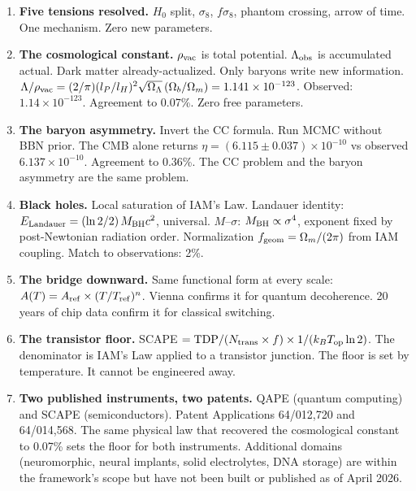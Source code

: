 \documentclass[12pt,a4paper]{article}
\begin{document}
\begin{enumerate}[leftmargin=1.5em,itemsep=0.3em]
\item \textbf{Five tensions resolved.} $H_0$ split, $\sigma_8$, $f\sigma_8$,
phantom crossing, arrow of time. One mechanism. Zero new parameters.

\item \textbf{The cosmological constant.} $\rho_{\rm vac}$ is total potential.
$\Lambda_{\rm obs}$ is accumulated actual. Dark matter already-actualized.
Only baryons write new information. $\Lambda/\rho_{\rm vac} = (2/\pi)(l_P/l_H)^2
\sqrt{\Omega_\Lambda}\,(\Omega_b/\Omega_m) = 1.141 \times 10^{-123}$.
Observed: $1.14 \times 10^{-123}$. Agreement to 0.07\%. Zero free parameters.

\item \textbf{The baryon asymmetry.} Invert the CC formula. Run MCMC without
BBN prior. The CMB alone returns $\eta = (6.115 \pm 0.037) \times 10^{-10}$
vs observed $6.137 \times 10^{-10}$. Agreement to 0.36\%. The CC problem and
the baryon asymmetry are the same problem.

\item \textbf{Black holes.} Local saturation of IAM's Law. Landauer identity:
$E_{\rm Landauer} = (\ln 2/2)\,M_{\rm BH}c^2$, universal. $M$--$\sigma$:
$M_{\rm BH} \propto \sigma^4$, exponent fixed by post-Newtonian radiation order.
Normalization $f_{\rm geom} = \Omega_m/(2\pi)$ from IAM coupling. Match to
observations: 2\%.

\item \textbf{The bridge downward.} Same functional form at every scale:
$A(T) = A_{\rm ref} \times (T/T_{\rm ref})^n$. Vienna confirms it for quantum
decoherence. 20 years of chip data confirm it for classical switching.

\item \textbf{The transistor floor.} SCAPE $= {\rm TDP}/(N_{\rm trans} \times f)
\times 1/(k_B T_{\rm op} \ln 2)$. The denominator is IAM's Law applied to a
transistor junction. The floor is set by temperature. It cannot be engineered away.

\item \textbf{Two published instruments, two patents.} QAPE (quantum computing)
and SCAPE (semiconductors). Patent Applications 64/012,720 and 64/014,568.
The same physical law that recovered the cosmological constant to 0.07\% sets
the floor for both instruments. Additional domains (neuromorphic, neural
implants, solid electrolytes, DNA storage) are within the framework's scope
but have not been built or published as of April 2026.


\end{enumerate}
\end{document}
